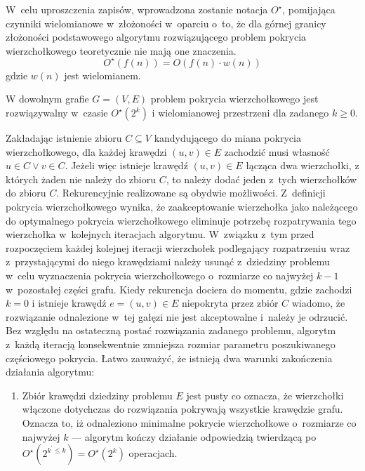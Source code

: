 \par{
  W~celu uproszczenia zapisów, wprowadzona zostanie notacja $O^{\star}$, pomijająca czynniki wielomianowe w~złożoności w~oparciu o~to, że dla górnej granicy złożoności podstawowego algorytmu rozwiązującego problem pokrycia wierzchołkowego teoretycznie nie mają one znaczenia.
  \begin{equation*}
    O^{\star}(f(n))=O(f(n) \cdot w(n))
  \end{equation*}
  gdzie $w(n)$ jest wielomianem.

  \begin{theorem}
    W dowolnym grafie $G=(V, E)$ problem pokrycia wierzchołkowego jest rozwiązywalny w~czasie $O^{\star}(2^k)$ i wielomianowej przestrzeni dla zadanego $k \geq 0$.
  \end{theorem}
  \begin{bproof}
    Zakładając istnienie zbioru $C \subseteq V$ kandydującego do miana pokrycia wierzchołkowego, dla każdej krawędzi $(u, v) \in E$ zachodzić musi własność  $u \in C \lor v \in C$.
    Jeżeli więc istnieje krawędź $(u, v) \in E$ łącząca dwa wierzchołki, z których żaden nie należy do zbioru $C$, to należy dodać jeden z~tych wierzchołków do zbioru $C$.
    Rekurencyjnie realizowane są obydwie możliwości.
    Z~definicji pokrycia wierzchołkowego wynika, że zaakceptowanie wierzchołka jako należącego do optymalnego pokrycia wierzchołkowego eliminuje potrzebę rozpatrywania tego wierzchołka w~kolejnych iteracjach algorytmu.
    W~związku z~tym przed rozpoczęciem każdej kolejnej iteracji wierzchołek podlegający rozpatrzeniu wraz z~przystającymi do niego krawędziami należy usunąć z~dziedziny problemu w~celu wyznaczenia pokrycia wierzchołkowego o~rozmiarze co najwyżej $k-1$ w~pozostałej części grafu.
    Kiedy rekurencja dociera do momentu, gdzie zachodzi $k=0$ i istnieje krawędź $e=(u,v) \in E$ niepokryta przez zbiór $C$ wiadomo, że rozwiązanie odnalezione w~tej gałęzi nie jest akceptowalne i~należy je odrzucić.
    Bez względu na ostateczną postać rozwiązania zadanego problemu, algorytm z~każdą iteracją konsekwentnie zmniejsza rozmiar parametru poszukiwanego częściowego pokrycia.
    Łatwo zauważyć, że istnieją dwa warunki zakończenia działania algorytmu:
    \begin{enumerate}
      \item Zbiór krawędzi dziedziny problemu $E$ jest pusty co oznacza, że wierzchołki włączone dotychczas do rozwiązania pokrywają wszystkie krawędzie grafu.
      Oznacza to, iż odnaleziono minimalne pokrycie wierzchołkowe o~rozmiarze co najwyżej $k$ --- algorytm kończy działanie odpowiedzią twierdzącą po $O^\star(2^{k^\prime \leq k})=O^\star(2^k)$ operacjach.

\end{enumerate}
\end{bproof}}
